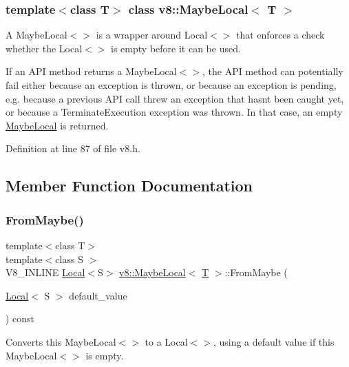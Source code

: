 \subsubsection*{template$<$class T$>$\newline
class v8\+::\+Maybe\+Local$<$ T $>$}

A Maybe\+Local$<$$>$ is a wrapper around Local$<$$>$ that enforces a check whether the Local$<$$>$ is empty before it can be used.

If an A\+PI method returns a Maybe\+Local$<$$>$, the A\+PI method can potentially fail either because an exception is thrown, or because an exception is pending, e.\+g. because a previous A\+PI call threw an exception that hasn\textquotesingle{}t been caught yet, or because a Terminate\+Execution exception was thrown. In that case, an empty \mbox{\hyperlink{classv8_1_1MaybeLocal}{Maybe\+Local}} is returned. 

Definition at line 87 of file v8.\+h.



\subsection{Member Function Documentation}
\mbox{\label{classv8_1_1MaybeLocal_ad99cb1e7ac1a4eac34c144faa4262407}} 
\subsubsection{\texorpdfstring{From\+Maybe()}{FromMaybe()}}
{\footnotesize\ttfamily template$<$class T$>$ \\
template$<$class S $>$ \\
V8\+\_\+\+I\+N\+L\+I\+NE \mbox{\hyperlink{classv8_1_1Local}{Local}}$<$S$>$ \mbox{\hyperlink{classv8_1_1MaybeLocal}{v8\+::\+Maybe\+Local}}$<$ \mbox{\hyperlink{classv8_1_1internal_1_1torque_1_1T}{T}} $>$\+::From\+Maybe (\begin{DoxyParamCaption}\item[{\mbox{\hyperlink{classv8_1_1Local}{Local}}$<$ S $>$}]{default\+\_\+value }\end{DoxyParamCaption}) const\hspace{0.3cm}{\ttfamily [inline]}}

Converts this Maybe\+Local$<$$>$ to a Local$<$$>$, using a default value if this Maybe\+Local$<$$>$ is empty. 


